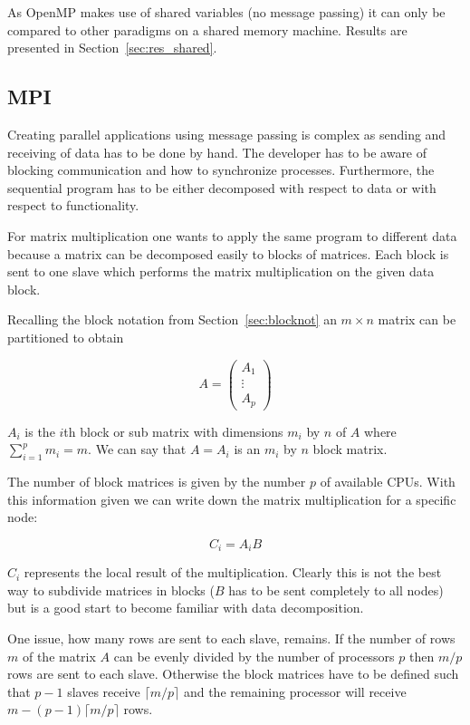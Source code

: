 As OpenMP makes use of shared variables (no message passing) it can
only be compared to other paradigms on a shared memory
machine. Results are presented in Section~\ref{sec:res_shared}.

\subsection{MPI}
\label{sec:mmMPI}

Creating parallel applications using message passing is
complex as sending and receiving of data has to be done by hand. The
developer has to be aware of blocking communication and how to
synchronize processes. Furthermore, the sequential program has to be
either decomposed with respect to data or with respect to
functionality.

For matrix multiplication one wants to apply the same
program to different data because a matrix can be decomposed
easily to blocks of matrices. Each block is sent to one slave which
performs the matrix multiplication on the given data block.

Recalling the block notation from Section~\ref{sec:blocknot} an $m
\times n$ matrix can be partitioned to obtain

$$ A = \left( \begin{array}{ccc}
A_{1} \\
\vdots\\
A_{p}
\end{array} \right)
$$

$A_{i}$ is the $i$th block or sub matrix with dimensions $m_i$ by
$n$ of $A$ where $\sum_{i=1}^p m_i = m$. 
We can say that $A = A_{i}$ is an $m_i$ by $n$ block
matrix. 

The number of block matrices is given by the number $p$ of available
CPUs. With this information given we can write down the matrix
multiplication for a specific node:

$$ C_{i} = A_{i}B $$

$C_{i}$ represents the local result of the multiplication. Clearly
this is not the best way to subdivide matrices in blocks ($B$ has to
be sent completely to all nodes) but is a good start to become
familiar with data decomposition.

One issue, how many rows are sent to each slave, remains. If the
number of rows $m$ of the matrix $A$ can be evenly divided by the number
of processors $p$ then $m/p$ rows are sent to each slave. Otherwise
the block matrices have to be defined such that 
$p - 1$ slaves receive $\lceil m/p \rceil$ and the remaining processor
will receive $m - (p - 1) \lceil m/p \rceil$ rows.

